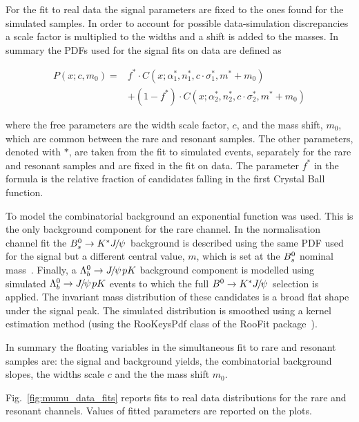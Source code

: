 For the fit to real data the signal parameters are fixed to the ones found for the simulated samples.
In order to account for possible data-simulation discrepancies a scale factor is multiplied to the widths
and a shift is added to the masses. In summary the PDFs used for the signal fits on data are defined as

\begin{align}
\label{eq:DCB_RKst}
P(x;c,m_0) = & f^{*} \cdot C(x;\alpha_1^{*},n_1^{*},c \cdot \sigma_1^{*}, m^{*} + m_0) \\
&+ (1 - f^{*}) \cdot C(x;\alpha_2^{*},n_2^{*},c \cdot \sigma_2^{*}, m^{*} + m_0)
\end{align}  

where the free parameters are the width scale factor, $c$, and the mass shift, $m_0$, which are common between the rare
and resonant samples. The other parameters, denoted with $*$, are taken from the fit to simulated events, 
separately for the rare and resonant samples and are fixed in the fit on data.
The parameter $f^{*}$ in the formula is the relative fraction of candidates falling in the first Crystal Ball function.

To model the combinatorial background an exponential function was used.
This is the only background component for the rare channel.
In the normalisation channel fit the $\Bs  \to \Kstar\jpsi$ background
is described using the same PDF used for the signal but a different central value, $m$,
which is set at the ${{B}^0_{s}}$ nominal mass~\cite{PDG2014}.
Finally, a $\Lb\to\jpsi pK$ background component is modelled using simulated $\Lb\to\jpsi pK$ events
to which the full $\Bz \to \Kstar\jpsi$ selection is applied. The invariant mass distribution
of these candidates is a broad flat shape under the signal peak. The simulated distribution 
is smoothed using a kernel estimation method (using the RooKeysPdf class of the RooFit package~\cite{Verkerke:2003ir}).

In summary the floating variables in the simultaneous fit to rare and resonant \mumu samples are:
the signal and background yields, the combinatorial background slopes, the widths scale $c$ and
the the mass shift $m_0$.

Fig.~\ref{fig:mumu_data_fits} reports fits to real data distributions for the rare and resonant
\mumu channels. Values of fitted parameters are reported on the plots.



